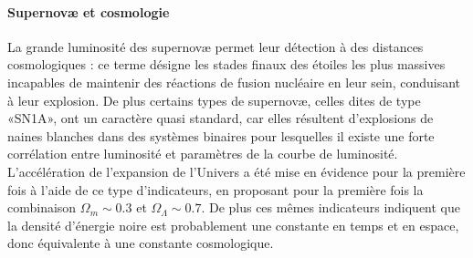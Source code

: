 \paragraph{Supernovæ et cosmologie}
La grande luminosité des supernovæ permet leur détection à des distances cosmologiques : ce terme désigne les stades finaux des étoiles les plus massives incapables de maintenir des réactions de fusion nucléaire en leur sein, conduisant à leur explosion. De plus certains types de supernovæ, celles dites de type «SN1A», ont un caractère quasi standard, car elles résultent d'explosions de naines blanches dans des systèmes binaires pour lesquelles il existe une forte corrélation entre luminosité et paramètres de la courbe de luminosité. L'accélération  de l'expansion de l'Univers a été mise en évidence pour la première fois à l'aide de ce type d'indicateurs, en proposant pour la première fois la combinaison $\Omega_m\sim0.3$ et $\Omega_\Lambda\sim0.7$. De plus ces mêmes indicateurs indiquent que la densité d'énergie noire est probablement une constante en temps et en espace, donc équivalente à une constante cosmologique.

